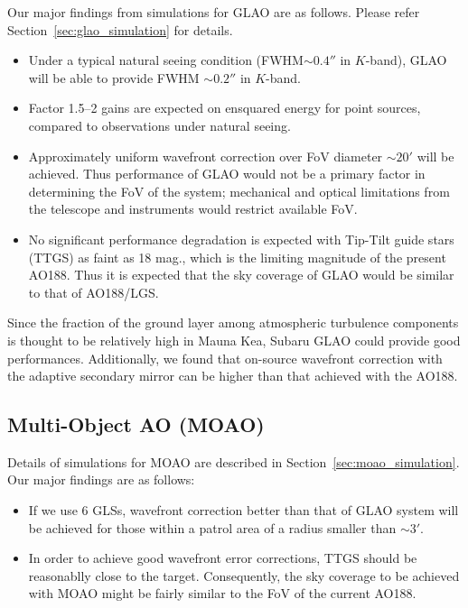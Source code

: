 Our major findings from simulations for GLAO are as follows. 
Please refer Section~\ref{sec:glao_simulation} for details.

\begin{itemize}
 \setlength{\itemsep}{-3pt}
 \item Under a typical natural seeing condition (FWHM$\sim 0.4''$ in
       $K$-band), GLAO will be able to provide FWHM $\sim 0.2''$ in
       $K$-band. 
 \item Factor 1.5--2 gains are expected on ensquared energy for point
       sources, compared to observations under natural seeing.
 \item Approximately uniform wavefront correction over FoV diameter
       $\sim 20'$ will be achieved. Thus performance of GLAO would not
       be a primary factor in determining the FoV of the system;
       mechanical and optical limitations from the telescope and
       instruments would restrict available FoV.
 \item No significant performance degradation is expected with Tip-Tilt
       guide stars (TTGS) as faint as 18 mag., which is the limiting magnitude
       of the present AO188. Thus it is expected that the sky coverage
       of GLAO would be similar to that of AO188/LGS.
\end{itemize}

Since the fraction of the ground layer among atmospheric turbulence
components is thought to be relatively high in Mauna Kea, Subaru GLAO
could provide good performances. Additionally, we found that on-source
wavefront correction with the adaptive secondary mirror can be higher
than that achieved with the AO188.


\subsection{Multi-Object AO (MOAO)}

Details of simulations for MOAO are described in
Section~\ref{sec:moao_simulation}. Our major findings are as follows:

\begin{itemize}
 \setlength{\itemsep}{-3pt}
 \item If we use 6 GLSs, wavefront correction better than that of GLAO
       system will be achieved for those within a patrol area of a
       radius smaller than $\sim 3'$.

 \item In order to achieve good wavefront error corrections, TTGS should
       be reasonablly close to the target. Consequently, the sky
       coverage to be achieved with MOAO might be fairly similar to the
       FoV of the current AO188.
\end{itemize}

